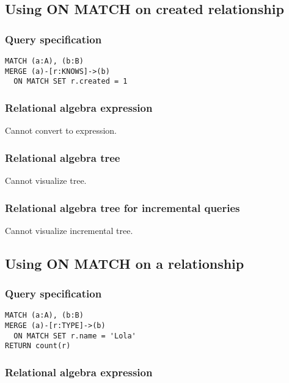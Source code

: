 \subsection{Using ON MATCH on created relationship}

\subsubsection*{Query specification}

\begin{lstlisting}
MATCH (a:A), (b:B)
MERGE (a)-[r:KNOWS]->(b)
  ON MATCH SET r.created = 1
\end{lstlisting}

\subsubsection*{Relational algebra expression}

Cannot convert to expression.

\subsubsection*{Relational algebra tree}

Cannot visualize tree.

\subsubsection*{Relational algebra tree for incremental queries}

Cannot visualize incremental tree.

\subsection{Using ON MATCH on a relationship}

\subsubsection*{Query specification}

\begin{lstlisting}
MATCH (a:A), (b:B)
MERGE (a)-[r:TYPE]->(b)
  ON MATCH SET r.name = 'Lola'
RETURN count(r)
\end{lstlisting}

\subsubsection*{Relational algebra expression}

